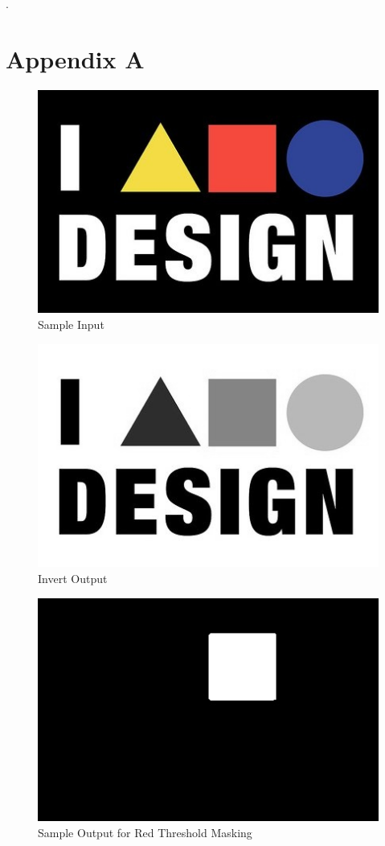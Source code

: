 .
\newpage
\section{Appendix A}\label{sec:vision_appendix_A}
\begin{figure}[h]
	\includegraphics[scale=0.5]{./figure/normal.jpg}
	\caption{Sample Input}
	\label{fig:normal output}
\end{figure}

\begin{figure}[h]
	\includegraphics[scale=0.5]{./figure/negative.jpg}
	\caption{Invert Output}
	\label{fig:Invert output}
\end{figure}

\begin{figure}[h]
	\includegraphics[scale=0.45]{./figure/mask.jpg}
	\caption{Sample Output for Red Threshold Masking}
	\label{fig:masking output}
\end{figure}


